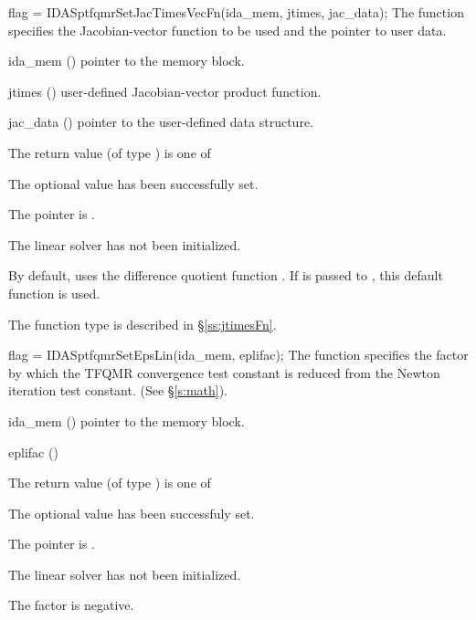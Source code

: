 {
  flag = IDASptfqmrSetJacTimesVecFn(ida\_mem, jtimes, jac\_data);
}
{
  The function  specifies the Jacobian-vector 
  function to be used and the pointer to user data.
}
{
  \begin{args}
  \item[ida\_mem] ()
    pointer to the {\ida} memory block.
  \item[jtimes] ()
    user-defined Jacobian-vector product function.
  \item[jac\_data] ()
     pointer to the user-defined data structure.
  \end{args}
}
{
  The return value  (of type ) is one of
  \begin{args}
  \item[\Id{IDASPTFQMR\_SUCCESS}] 
    The optional value has been successfully set.
  \item[\Id{IDASPTFQMR\_MEM\_NULL}]
    The  pointer is .
  \item[\Id{IDASPTFQMR\_LMEM\_NULL}]
    The {\idaspgmr} linear solver has not been initialized.
  \end{args}
}
{
  By default, {\idasptfqmr} uses the difference quotient function .
  If  is passed to , this default function is used.

  The function type  is described in \S\ref{ss:jtimesFn}.
}
{
  flag = IDASptfqmrSetEpsLin(ida\_mem, eplifac);
}
{
  The function  specifies the factor by
  which the TFQMR convergence test constant is reduced
  from the Newton iteration test constant. (See \S\ref{s:math}).
}
{
  \begin{args}
  \item[ida\_mem] ()
    pointer to the {\ida} memory block.
  \item[eplifac] ()

  \end{args}
}
{
  The return value  (of type ) is one of
  \begin{args}
  \item[\Id{IDASPTFQMR\_SUCCESS}] 
    The optional value has been successfuly set.
  \item[\Id{IDASPTFQMR\_MEM\_NULL}]
    The  pointer is .
  \item[\Id{IDASPTFQMR\_LMEM\_NULL}]
    The {\idaspgmr} linear solver has not been initialized.
  \item[\Id{IDASPTFQMR\_ILL\_INPUT}]
    The factor  is negative.  
  \end{args}
}
